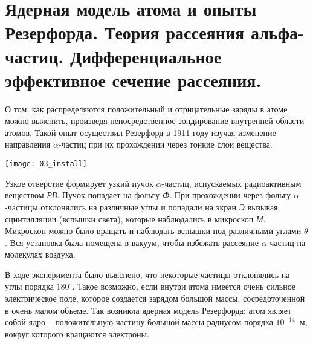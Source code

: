 \chapter{Ядерная модель атома и опыты Резерфорда. Теория рассеяния 
альфа-частиц. Дифференциальное эффективное сечение рассеяния.}

О том, как распределяются положительный и отрицательные заряды в атоме можно
выяснить, произведя непосредственное зондирование внутренней области атомов.
Такой опыт осуществил Резерфорд в 1911 году изучая изменение направления
\( \alpha \)-частиц при их прохождении через тонкие слои вещества.

\begin{minipage}{.4\textwidth}
    \texttt{[image: 03\_install]}
\end{minipage}
\begin{minipage}{.55\textwidth}
    Узкое отверстие формирует узкий пучок \( \alpha \)-частиц, испускаемых
    радиоактивным веществом \emph{РВ}. Пучок попадает на фольгу \emph{Ф}. При
    прохождении через фольгу \( \alpha \)-частицы отклонялись на различные углы
    и попадали на экран \emph{Э} вызывая сцинтилляции (вспышки света), которые
    наблюдались в микроскоп \emph{М}. Микроскоп можно было вращать и наблюдать
    вспышки под различными углами \( \theta \). Вся установка была помещена в
    вакуум, чтобы избежать рассеяние \( \alpha \)-частиц на молекулах воздуха.
\end{minipage}

В ходе эксперимента было выяснено, что некоторые частицы отклонялись на углы
порядка \( 180^\circ \). Такое возможно, если внутри атома имеется очень сильное
электрическое поле, которое создается зарядом большой массы, сосредоточенной в
очень малом объеме. Так возникла ядерная модель Резерфорда: атом являет собой
ядро -- положительную частицу большой массы радиусом порядка \( 10^{-14} \)~м,
вокруг которого вращаются электроны.

